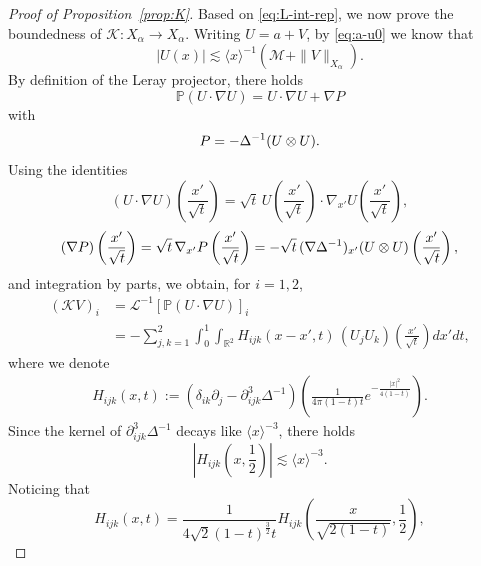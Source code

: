\documentclass[12pt,reqno]{amsart}
\theoremstyle{plain}
\theoremstyle{definition}
\newcommand{\R}{\mathbb{R}}
\newcommand{\M}{\mathcal{M}}
\renewcommand{\:}{\colon}
\let\div\relax
\DeclareMathOperator{\div}{div}
\numberwithin{equation}{section}
\numberwithin{figure}{section}
\begin{document}
\begin{proof}[Proof of Proposition~\ref{prop:K}]
    Based on \eqref{eq:L-int-rep}, we now  prove the boundedness of $\mathcal{K}: X_\alpha \to X_\alpha$. Writing $U = a+V$, by \eqref{eq:a-u0} we know that
    \begin{equation} \label{eq:U-upper}
        |U(x)| \lesssim \langle x \rangle^{-1} (\M+\|V\|_{X_\alpha}).     
    \end{equation}
    By definition of the Leray projector, there holds
    \begin{equation}
        \mathbb{P}(U \cdot \nabla U) = U \cdot \nabla U + \nabla P
    \end{equation}
    with
    \begin{equation} \label{eq:P-def-1}
         P = - \Delta^{-1} \div \div (U\otimes U).
    \end{equation}
    Using the identities
    \begin{equation}
        (U \cdot \nabla U)\left(\frac{x'}{\sqrt{t}}\right) = \sqrt{t} \, U\left(\frac{x'}{\sqrt{t}}\right) \cdot\nabla_{x'} U\left(\frac{x'}{\sqrt{t}}\right),
    \end{equation}
    \begin{equation}
        (\nabla P)\left(\frac{x'}{\sqrt{t}}\right) = \sqrt{t} \, \nabla_{x'} P\left(\frac{x'}{\sqrt{t}}\right) = -\sqrt{t} \, (\nabla \Delta^{-1} \div \div)_{x'} (U\otimes U) \left(\frac{x'}{\sqrt{t}}\right),
    \end{equation}
    and integration by parts, we obtain, for $i=1,2$,
    \begin{align} \label{eq:KV-rep}
        (\mathcal{K}V)_i &= \mathcal{L}^{-1} [\mathbb{P} (U \cdot \nabla U)]_i \nonumber \\
        &= -\sum_{j,k=1}^2 \int_0^1 \int_{\R^2} H_{ijk} (x-x',t) \, (U_j U_k)\left(\frac{x'}{\sqrt{t}}\right) dx' dt,
    \end{align}
    where we denote
    \begin{align}
        H_{ijk}(x,t) :=  (\delta_{ik}\partial_j-\partial^3_{ijk} \Delta^{-1}) \left(  \frac{1}{4 \pi (1-t) t} e^{-\frac{|x|^2}{4(1-t)}} \right).
    \end{align}
    Since the kernel of $\partial^3_{ijk} \Delta^{-1}$ decays like $\langle x \rangle^{-3}$, there holds 
    \begin{equation}
        \left|H_{ijk}\left(x,\frac12\right)\right| \lesssim \langle x \rangle^{-3}.
    \end{equation}
    Noticing that
    \begin{equation}
        H_{ijk}(x,t) = \frac{1}{4\sqrt{2} (1-t)^\frac32 t} H_{ijk} \left(\frac{x}{\sqrt{2(1-t)}}, \frac12\right),

\end{equation}
\end{proof}
\end{document}
